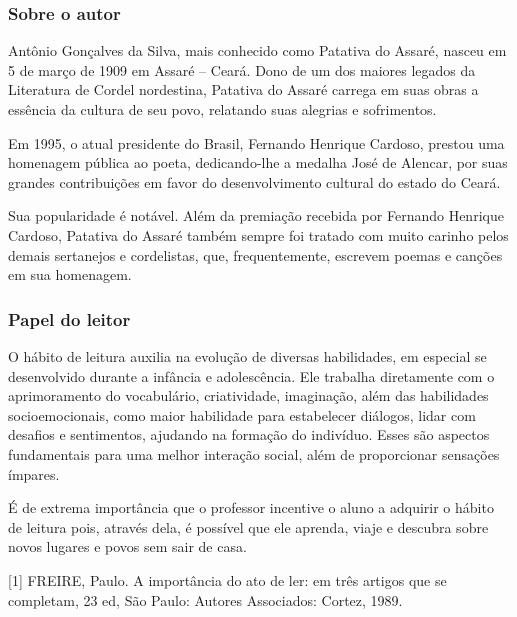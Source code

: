 \documentclass[12pt]{extarticle}
\begin{document}
\subsubsection{{Sobre o autor}}

Antônio Gonçalves da Silva, mais conhecido como Patativa do Assaré,
nasceu em 5 de março de 1909 em Assaré -- Ceará. Dono de um dos maiores
legados da Literatura de Cordel nordestina, Patativa do Assaré carrega
em suas obras a essência da cultura de seu povo, relatando suas alegrias
e sofrimentos.


Em 1995, o atual presidente do Brasil, Fernando Henrique Cardoso,
prestou uma homenagem pública ao poeta, dedicando-lhe a medalha José de
Alencar, por suas grandes contribuições em favor do desenvolvimento
cultural do estado do Ceará.

Sua popularidade é notável. Além da premiação recebida por Fernando
Henrique Cardoso, Patativa do Assaré também sempre foi tratado com muito
carinho pelos demais sertanejos e cordelistas, que, frequentemente,
escrevem poemas e canções em sua homenagem.


\subsubsection{{Papel do leitor}}

O hábito de leitura auxilia na evolução de diversas habilidades, em
especial se desenvolvido durante a infância e adolescência. Ele trabalha
diretamente com o aprimoramento do vocabulário, criatividade,
imaginação, além das habilidades socioemocionais, como maior habilidade
para estabelecer diálogos, lidar com desafios e sentimentos, ajudando na
formação do indivíduo. Esses são aspectos fundamentais para uma melhor
interação social, além de proporcionar sensações ímpares.

É de extrema importância que o professor incentive o aluno a adquirir o
hábito de leitura pois, através dela, é possível que ele aprenda, viaje
e descubra sobre novos lugares e povos sem sair de casa.

{[}1{]} FREIRE, Paulo. A importância do ato de ler: em três artigos que
se completam, 23 ed, São Paulo: Autores Associados: Cortez, 1989.
\end{document}
